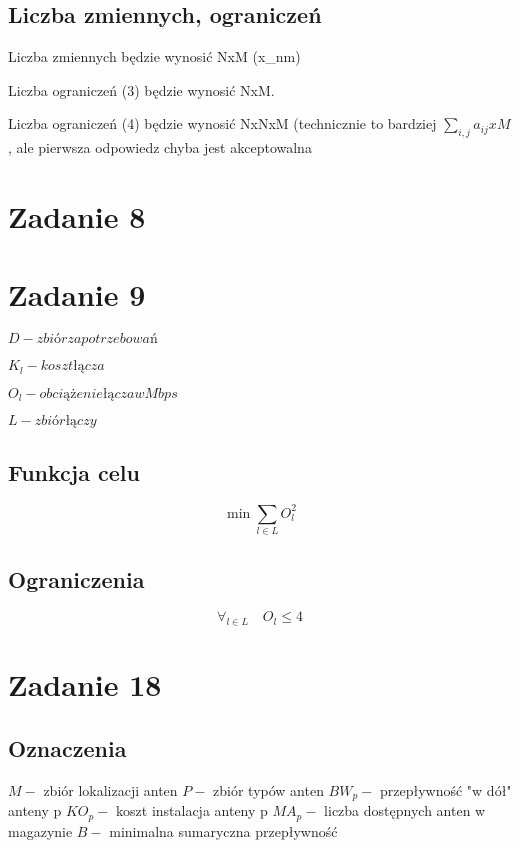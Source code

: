 \documentclass{article}
\begin{document}
\subsection{Liczba zmiennych, ograniczeń}

Liczba zmiennych będzie wynosić NxM (x_{nm})

Liczba ograniczeń (3) będzie wynosić NxM.

Liczba ograniczeń (4) będzie wynosić NxNxM (technicznie to bardziej $\sum_{i,j} a_{ij} x M$, ale pierwsza odpowiedz chyba jest akceptowalna


\section{Zadanie 8}


\section{Zadanie 9}

$D - zbiór zapotrzebowań$

$K_l - koszt łącza$

$O_l - obciążenie łącza w Mbps$

$L - zbiór łączy$

\subsection{Funkcja celu}
\begin{equation}
\min \sum_{l \in L} O_l^2
\end{equation}


\subsection{Ograniczenia}

\begin{equation}
  \forall_{l \in L} \quad O_l \leq 4
\end{equation}

\section{Zadanie 18}

\subsection{Oznaczenia}
$M - $ zbiór lokalizacji anten
$P - $ zbiór typów anten
$BW_p - $ przepływność "w dół" anteny p
$KO_p - $ koszt instalacja anteny p
$MA_p - $ liczba dostępnych anten w magazynie
$B - $ minimalna sumaryczna przepływność
\end{document}
